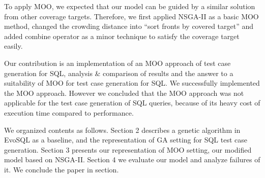 To apply MOO, we expected that our model can be guided by a similar solution from other coverage targets. Therefore, we first applied NSGA-II\cite{deb2002fast} as a basic MOO method, changed the crowding distance into ``sort fronts by covered target'' and added combine operator as a minor technique to satisfy the coverage target easily.
 

Our contribution is an implementation of an MOO approach of test case generation for SQL, analysis \& comparison of results and the answer to a suitability of MOO for test case generation for SQL. We successfully implemented the MOO approach. However we concluded that the MOO approach was not applicable for the test case generation of SQL queries, because of its heavy cost of execution time compared to performance.
 
We organized contents as follows. Section 2 describes a genetic algorithm in EvoSQL as a baseline, and the representation of GA setting for SQL test case generation. Section 3 presents our representation of MOO setting, our modified model based on NSGA-II. Section 4 we evaluate our model and analyze failures of it. We conclude the paper in section.
